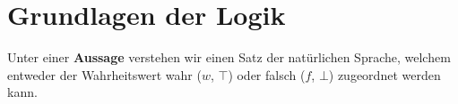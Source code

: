 \documentclass[../../main.tex]{subfiles}
\begin{document}

	
	\chapter{Grundlagen der Logik}
	
	\begin{definition}[Aussage]
		\label{def:Aussage}
		Unter einer \textbf{Aussage} verstehen wir einen Satz der natürlichen Sprache, welchem entweder der Wahrheitswert wahr ($w$, $\top$) oder falsch ($f$, $\bot$) zugeordnet werden kann.
	\end{definition}
	
\end{document}
